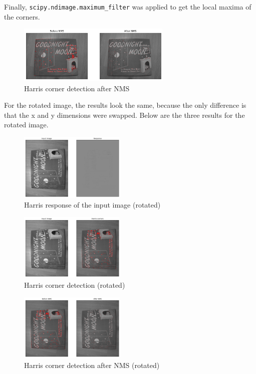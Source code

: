 \documentclass{article}
\begin{document}
    Finally, \verb|scipy.ndimage.maximum_filter| was applied to get the local maxima of the corners.

    \begin{figure}[H]
        \centering
        \includegraphics[width = 0.65\textwidth]{harris_after.png}
        \caption{Harris corner detection after NMS}
        \label{img:harris_after}
    \end{figure}

    For the rotated image, the results look the same, because the only difference is that the x and y dimensions were swapped.
    Below are the three results for the rotated image.

    \begin{figure}[H]
        \centering
        \includegraphics[width = 0.45\textwidth]{harris_response_rotated.png}
        \caption{Harris response of the input image (rotated)}
        \label{img:harris_response_rotated}
    \end{figure}

    \begin{figure}[H]
        \centering
        \includegraphics[width = 0.45\textwidth]{harris_before_rotated.png}
        \caption{Harris corner detection (rotated)}
        \label{img:harris_before_rotated}
    \end{figure}   

    \begin{figure}[H]
        \centering
        \includegraphics[width = 0.45\textwidth]{harris_after_rotated.png}
        \caption{Harris corner detection after NMS (rotated)}
        \label{img:harris_after_rotated}
    \end{figure}
\end{document}
